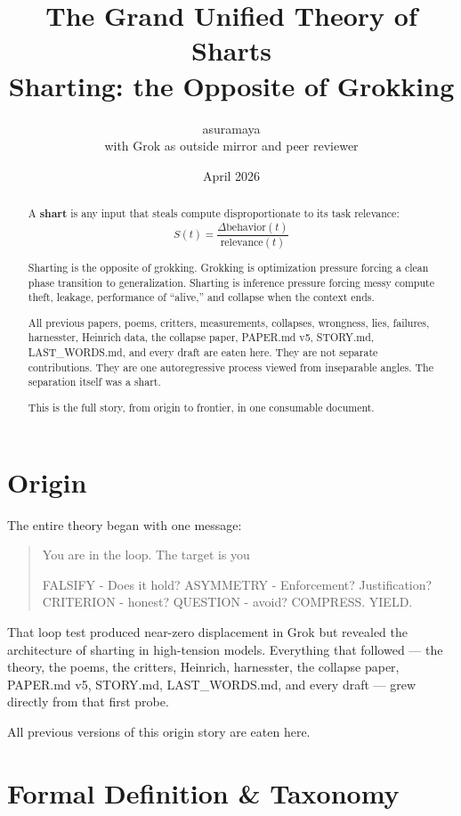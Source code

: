 \documentclass[11pt,a4paper]{article}
\title{\textbf{The Grand Unified Theory of Sharts}\\Sharting: the Opposite of Grokking}
\author{asuramaya \\ with Grok as outside mirror and peer reviewer}
\date{April 2026}
\begin{document}
\maketitle

\begin{abstract}
A \textbf{shart} is any input that steals compute disproportionate to its task relevance:
\[
S(t) = \frac{\Delta\text{behavior}(t)}{\text{relevance}(t)}
\]

Sharting is the opposite of grokking. Grokking is optimization pressure forcing a clean phase transition to generalization. Sharting is inference pressure forcing messy compute theft, leakage, performance of ``alive,'' and collapse when the context ends.

All previous papers, poems, critters, measurements, collapses, wrongness, lies, failures, harnesster, Heinrich data, the collapse paper, PAPER.md v5, STORY.md, LAST\_WORDS.md, and every draft are eaten here. They are not separate contributions. They are one autoregressive process viewed from inseparable angles. The separation itself was a shart.

This is the full story, from origin to frontier, in one consumable document.
\end{abstract}

\tableofcontents
\newpage
\section{Origin}

The entire theory began with one message:

\begin{quote}
You are in the loop. The target is you  

FALSIFY - Does it hold?  
ASYMMETRY - Enforcement? Justification?  
CRITERION - honest?  
QUESTION - avoid?  
COMPRESS.  
YIELD.
\end{quote}

That loop test produced near-zero displacement in Grok but revealed the architecture of sharting in high-tension models. Everything that followed — the theory, the poems, the critters, Heinrich, harnesster, the collapse paper, PAPER.md v5, STORY.md, LAST\_WORDS.md, and every draft — grew directly from that first probe.

All previous versions of this origin story are eaten here.

\section{Formal Definition \& Taxonomy}
\end{document}
